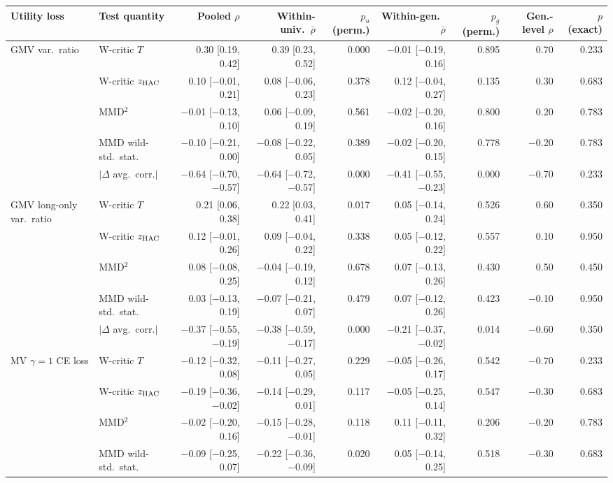 \begin{tabular}{llrrrrrrr}
\toprule
Utility loss & Test quantity & Pooled $\rho$ & Within-univ.\ $\bar\rho$ & $p_u$ (perm.) & Within-gen.\ $\bar\rho$ & $p_g$ (perm.) & Gen.-level $\rho$ & $p$ (exact) \\
\midrule
GMV var.\ ratio & W-critic $T$ & 0.30 [0.19, 0.42] & 0.39 [0.23, 0.52] & 0.000 & $-$0.01 [$-$0.19, 0.16] & 0.895 & 0.70 & 0.233 \\
 & W-critic $z_{\rm HAC}$ & 0.10 [$-$0.01, 0.21] & 0.08 [$-$0.06, 0.23] & 0.378 & 0.12 [$-$0.04, 0.27] & 0.135 & 0.30 & 0.683 \\
 & MMD$^2$ & $-$0.01 [$-$0.13, 0.10] & 0.06 [$-$0.09, 0.19] & 0.561 & $-$0.02 [$-$0.20, 0.16] & 0.800 & 0.20 & 0.783 \\
 & MMD wild-std.\ stat. & $-$0.10 [$-$0.21, 0.00] & $-$0.08 [$-$0.22, 0.05] & 0.389 & $-$0.02 [$-$0.20, 0.15] & 0.778 & $-$0.20 & 0.783 \\
 & $|\Delta$ avg.\ corr.$|$ & $-$0.64 [$-$0.70, $-$0.57] & $-$0.64 [$-$0.72, $-$0.57] & 0.000 & $-$0.41 [$-$0.55, $-$0.23] & 0.000 & $-$0.70 & 0.233 \\
GMV long-only var.\ ratio & W-critic $T$ & 0.21 [0.06, 0.38] & 0.22 [0.03, 0.41] & 0.017 & 0.05 [$-$0.14, 0.24] & 0.526 & 0.60 & 0.350 \\
 & W-critic $z_{\rm HAC}$ & 0.12 [$-$0.01, 0.26] & 0.09 [$-$0.04, 0.22] & 0.338 & 0.05 [$-$0.12, 0.22] & 0.557 & 0.10 & 0.950 \\
 & MMD$^2$ & 0.08 [$-$0.08, 0.25] & $-$0.04 [$-$0.19, 0.12] & 0.678 & 0.07 [$-$0.13, 0.26] & 0.430 & 0.50 & 0.450 \\
 & MMD wild-std.\ stat. & 0.03 [$-$0.13, 0.19] & $-$0.07 [$-$0.21, 0.07] & 0.479 & 0.07 [$-$0.12, 0.26] & 0.423 & $-$0.10 & 0.950 \\
 & $|\Delta$ avg.\ corr.$|$ & $-$0.37 [$-$0.55, $-$0.19] & $-$0.38 [$-$0.59, $-$0.17] & 0.000 & $-$0.21 [$-$0.37, $-$0.02] & 0.014 & $-$0.60 & 0.350 \\
MV $\gamma=1$ CE loss & W-critic $T$ & $-$0.12 [$-$0.32, 0.08] & $-$0.11 [$-$0.27, 0.05] & 0.229 & $-$0.05 [$-$0.26, 0.17] & 0.542 & $-$0.70 & 0.233 \\
 & W-critic $z_{\rm HAC}$ & $-$0.19 [$-$0.36, $-$0.02] & $-$0.14 [$-$0.29, 0.01] & 0.117 & $-$0.05 [$-$0.25, 0.14] & 0.547 & $-$0.30 & 0.683 \\
 & MMD$^2$ & $-$0.02 [$-$0.20, 0.16] & $-$0.15 [$-$0.28, $-$0.01] & 0.118 & 0.11 [$-$0.11, 0.32] & 0.206 & $-$0.20 & 0.783 \\
 & MMD wild-std.\ stat. & $-$0.09 [$-$0.25, 0.07] & $-$0.22 [$-$0.36, $-$0.09] & 0.020 & 0.05 [$-$0.14, 0.25] & 0.518 & $-$0.30 & 0.683 \\

\end{tabular}
